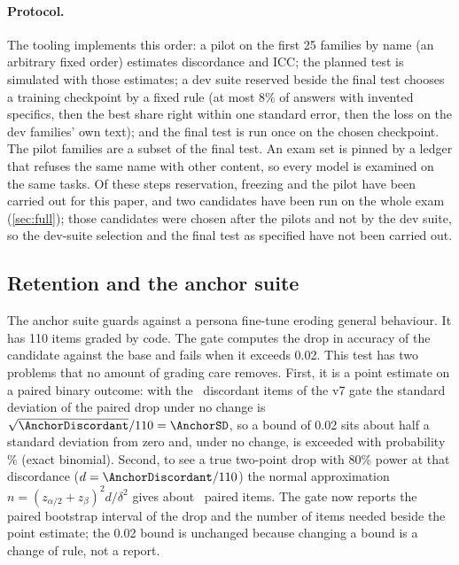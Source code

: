 \paragraph{Protocol.}
The tooling implements this order: a pilot on the first 25 families by name (an arbitrary
fixed order) estimates discordance and ICC; the planned test is simulated with those
estimates; a dev suite reserved beside the final test chooses a training checkpoint by a
fixed rule (at most 8\% of answers with invented specifics, then the best share right
within one standard error, then the loss on the dev families' own text); and the final
test is run once on the chosen checkpoint. The pilot families are a subset of the final
test. An exam set is pinned by a ledger that refuses the same name with other content, so
every model is examined on the same tasks. Of these steps reservation, freezing and the pilot
have been carried out for this paper, and two candidates have been run on the whole exam
(\cref{sec:full}); those candidates were chosen after the pilots and not by the dev suite, so the
dev-suite selection and the final test as specified have not been carried out.

\subsection{Retention and the anchor suite}

The anchor suite guards against a persona fine-tune eroding general behaviour. It has 110
items graded by code. The gate computes the drop in accuracy of the candidate against the
base and fails when it exceeds 0.02. This test has two problems that no amount of
grading care removes. First, it is a point estimate on a paired binary outcome: with the
\AnchorDiscordant\ discordant items of the v7 gate the standard deviation of the paired
drop under no change is $\sqrt{\AnchorDiscordant}/110=\AnchorSD$, so a bound of 0.02 sits
about half a standard deviation from zero and, under no change, is exceeded with
probability \AnchorExceed\% (exact binomial). Second, to see a true two-point drop with 80\%
power at that discordance ($d=\AnchorDiscordant/110$) the normal approximation
$n=(z_{\alpha/2}+z_\beta)^2 d/\delta^2$ gives about \AnchorItemsNeeded\ paired items. The gate now
reports the paired bootstrap interval of the drop and the number of items needed beside the point
estimate; the 0.02 bound is unchanged because changing a bound is a change of rule, not a
report.

\begin{table}[t]
\centering\footnotesize\setlength{\tabcolsep}{3pt}

\caption{The anchor suite in three release-gate runs. ``Drop'' is the base's accuracy minus
the candidate's; $p$ is the exact two-sided sign test on the discordant items. The bound is
0.02; the first two rows failed it although neither drop is distinguishable from no
change.}
\label{tab:anchor}
\end{table}

